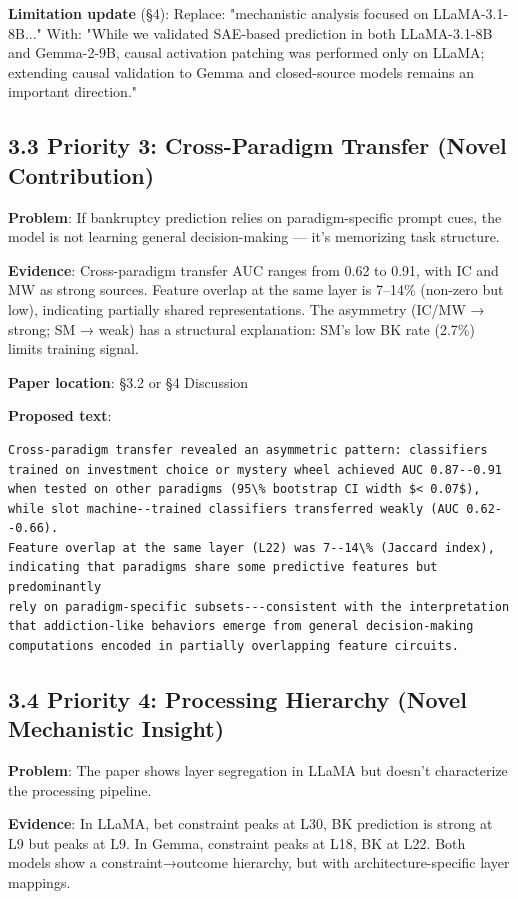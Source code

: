 \documentclass[11pt,a4paper]{article}
\begin{document}
\textbf{Limitation update} (§4):
Replace: "mechanistic analysis focused on LLaMA-3.1-8B..."
With: "While we validated SAE-based prediction in both LLaMA-3.1-8B and Gemma-2-9B, causal activation patching was performed only on LLaMA; extending causal validation to Gemma and closed-source models remains an important direction."

\subsection{3.3 Priority 3: Cross-Paradigm Transfer (Novel Contribution)}

\textbf{Problem}: If bankruptcy prediction relies on paradigm-specific prompt cues, the model is not learning general decision-making — it's memorizing task structure.

\textbf{Evidence}: Cross-paradigm transfer AUC ranges from 0.62 to 0.91, with IC and MW as strong sources. Feature overlap at the same layer is 7–14\% (non-zero but low), indicating partially shared representations. The asymmetry (IC/MW → strong; SM → weak) has a structural explanation: SM's low BK rate (2.7\%) limits training signal.

\textbf{Paper location}: §3.2 or §4 Discussion

\textbf{Proposed text}:
\begin{verbatim}
Cross-paradigm transfer revealed an asymmetric pattern: classifiers
trained on investment choice or mystery wheel achieved AUC 0.87--0.91
when tested on other paradigms (95\% bootstrap CI width $< 0.07$),
while slot machine--trained classifiers transferred weakly (AUC 0.62--0.66).
Feature overlap at the same layer (L22) was 7--14\% (Jaccard index),
indicating that paradigms share some predictive features but predominantly
rely on paradigm-specific subsets---consistent with the interpretation
that addiction-like behaviors emerge from general decision-making
computations encoded in partially overlapping feature circuits.
\end{verbatim}

\subsection{3.4 Priority 4: Processing Hierarchy (Novel Mechanistic Insight)}

\textbf{Problem}: The paper shows layer segregation in LLaMA but doesn't characterize the processing pipeline.

\textbf{Evidence}: In LLaMA, bet constraint peaks at L30, BK prediction is strong at L9 but peaks at L9. In Gemma, constraint peaks at L18, BK at L22. Both models show a constraint→outcome hierarchy, but with architecture-specific layer mappings.
\end{document}
